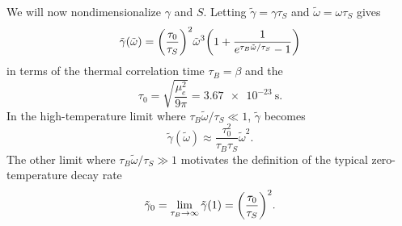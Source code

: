\documentclass[../thesis.tex]{subfiles}
\begin{document}
We will now nondimensionalize $\gamma$ and $S$. Letting $\tilde{\gamma} = \gamma
\tau_S$ and $\tilde{\omega} = \omega\tau_S$ gives
\begin{equation}
  \tilde{\gamma}(\tilde{\omega})
  = {\qty(\frac{\tau_0}{\tau_S})}^2 \tilde{\omega}^3
  \qty(1 + \frac{1}{e^{\tau_B \tilde{\omega} / \tau_S} - 1})
  \label{eq:gamma-nondim}
\end{equation}
in terms of the thermal correlation time $\tau_B = \beta$ and the
\begin{equation}
  \tau_0
  = \sqrt{\frac{\mu_e^2}{9\pi}}
  = \SI{3.67e-23}{\s}.
  \label{eq:tau0}
\end{equation}
In the high-temperature limit where $\tau_B\tilde{\omega}/\tau_S \ll 1$,
$\tilde{\gamma}$ becomes
\begin{equation}
  \tilde{\gamma}(\tilde{\omega})
  \approx \frac{\tau_0^2}{\tau_B \tau_S} \tilde{\omega}^2.
\end{equation}
The other limit where $\tau_B\tilde{\omega}/\tau_S \gg 1$ motivates the
definition of the typical zero-temperature decay rate
\begin{equation}
  \tilde{\gamma}_0
  = \lim_{\tau_B \to \infty} \tilde{\gamma}(1)
  = {\qty(\frac{\tau_0}{\tau_S})}^2.
\end{equation}
\end{document}
